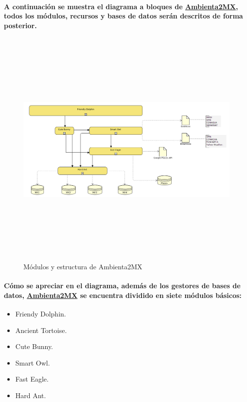     \paragraph{A continuación se muestra el diagrama a bloques de \underline{Ambienta2MX}, todos los módulos, recursos y bases de datos serán descritos de forma posterior.}
  \newpage
    \begin{landscape}
      \begin{figure}[h!]
      \centering
      \includegraphics[width=22.5cm,height=12cm]{./images/DiagramaAmbienta2MX.png}
      \caption{Módulos y estructura de Ambienta2MX}
    \end{figure}
    \end{landscape}
  \newpage
    \paragraph{Cómo se apreciar en el diagrama, además de los gestores de bases de datos, \underline{Ambienta2MX} se encuentra dividido en siete módulos básicos:}
    \begin{itemize}
    \item Friendy Dolphin.
    \item Ancient Tortoise.
    \item Cute Bunny.
    \item Smart Owl.
    \item Fast Eagle.
    \item Hard Ant.
  \end{itemize}

